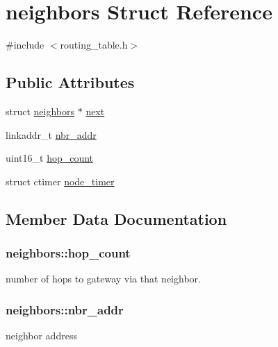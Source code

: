 \hypertarget{structneighbors}{}\section{neighbors Struct Reference}
\label{structneighbors}


{\ttfamily \#include $<$routing\+\_\+table.\+h$>$}

\subsection*{Public Attributes}
\begin{DoxyCompactItemize}
\item 
struct \hyperlink{structneighbors}{neighbors} $\ast$ \hyperlink{structneighbors_ac2168f200163eaa32fb01444a94ab16d}{next}
\item 
linkaddr\+\_\+t \hyperlink{structneighbors_af4a9eba693293b926d00c4957734a679}{nbr\+\_\+addr}
\item 
uint16\+\_\+t \hyperlink{structneighbors_afdef5e54f1191f6337eb01f5034a2ef8}{hop\+\_\+count}
\item 
struct ctimer \hyperlink{structneighbors_afe56765f4d5b05b9b6072923540a459e}{node\+\_\+timer}
\end{DoxyCompactItemize}


\subsection{Member Data Documentation}
\subsubsection[{\texorpdfstring{hop\+\_\+count}{hop_count}}]{\setlength{\rightskip}{0pt plus 5cm}neighbors\+::hop\+\_\+count}\hypertarget{structneighbors_afdef5e54f1191f6337eb01f5034a2ef8}{}\label{structneighbors_afdef5e54f1191f6337eb01f5034a2ef8}
number of hops to gateway via that neighbor.~\newline
\subsubsection[{\texorpdfstring{nbr\+\_\+addr}{nbr_addr}}]{\setlength{\rightskip}{0pt plus 5cm}neighbors\+::nbr\+\_\+addr}\hypertarget{structneighbors_af4a9eba693293b926d00c4957734a679}{}\label{structneighbors_af4a9eba693293b926d00c4957734a679}
neighbor address ~\newline
